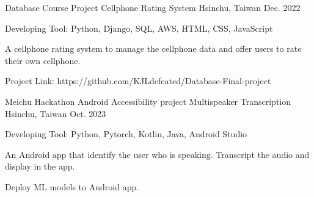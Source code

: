 \begin{cventries}
  \cventry
    {Database Course Project} 
    {Cellphone Rating System} 
    {Hsinchu, Taiwan} 
    {Dec. 2022} 
    {
      \begin{cvitems} %
        \item {Developing Tool: Python, Django, SQL, AWS, HTML, CSS, JavaScript}
        \item {A cellphone rating system to manage the cellphone data and offer users to rate their own cellphone.}
        \item {Project Link: https://github.com/KJLdefeated/Database-Final-project}
      \end{cvitems}
    }



\cventry
    {Meichu Hackathon Android Accessibility project} 
    {Multispeaker Transcription} 
    {Hsinchu, Taiwan} 
    {Oct. 2023}
    {
      \begin{cvitems} %
        \item {Developing Tool: Python, Pytorch, Kotlin, Java, Android Studio}
        \item {An Android app that identify the user who is speaking. Transcript the audio and display in the app.}
        \item {Deploy ML models to Android app.}
      \end{cvitems}
    }

\end{cventries}
